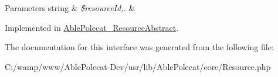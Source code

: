 \begin{DoxyParams}[1]{Parameters}
string & {\em \$resource\+Id,.} & \\
\hline
\end{DoxyParams}


Implemented in \hyperlink{class_able_polecat___resource_abstract_a1e0f2eaa0b2087d67e47c9f9ab72eaab}{Able\+Polecat\+\_\+\+Resource\+Abstract}.



The documentation for this interface was generated from the following file\+:\begin{DoxyCompactItemize}
\item 
C\+:/wamp/www/\+Able\+Polecat-\/\+Dev/usr/lib/\+Able\+Polecat/core/Resource.\+php\end{DoxyCompactItemize}
